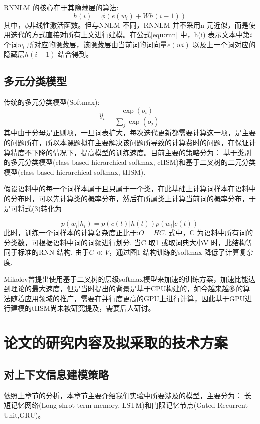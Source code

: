 \documentclass[12pt,a4paper]{article}
\begin{document}
RNNLM 的核心在于其隐藏层的算法:
\begin{equation}
\label{equ:rnn}
h(i) =\phi(e(w_i) +Wh(i -1))
\end{equation}
其中，$\phi$非线性激活函数。但与NNLM 不同，RNNLM 并不采用n 元近似，而是使用迭代的方式直接对所有上文进行建模。在公式\ref{equ:rnn} 中，h(i) 表示文本中第$i$ 个词$w_i$ 所对应的隐藏层，该隐藏层由当前词的词向量$e(wi)$ 以及上一个词对应的隐藏层$h(i -1)$ 结合得到。

\subsection{多元分类模型}
传统的多元分类模型(Softmax):
\begin{equation}\label{equ:softmax}
  \hat y_i=\frac{\exp(o_i)}{\sum_j \exp(o_j)}
\end{equation}
其中由于分母是正则项，一旦词表扩大，每次迭代更新都需要计算这一项，是主要的问题所在，所以本课题拟在主要解决该问题所导致的计算费时的问题，在保证计算精度不下降的情况下，提高模型的训练速度。目前主要的策略分为： 基于类别的多元分类模型(class-based hierarchical softmax, cHSM)和基于二叉树的二元分类模型(class-based hierarchical softmax, tHSM).

假设语料中的每一个词样本属于且只属于一个类，在此基础上计算词样本在语料中的分布时，可以先计算类的概率分布，然后在所属类上计算当前词的概率分布，于是可将式(3)转化为

\begin{equation}\label{equ:class}
  p(w_i|h_i) = p(c(t)|h(t))p(w_i|c(t))
\end{equation}
此时，训练一个词样本的计算复杂度正比于:$O =HC$. 式中，C 为语料中所有词的分类数，可根据语料中词的词频进行划分. 当C 取1 或取词典大小V 时，此结构等同于标准的RNN 结构. 由于$C \ll V$，通过图1 结构训练的softmax 降低了计算复杂度.

Mikolov曾提出使用基于二叉树的层级softmax模型来加速的训练方案，加速比能达到理论的最大速度，但是当时提出的背景是基于CPU构建的，如今越来越多的算法随着应用领域的推广，需要在并行度更高的GPU上进行计算，因此基于GPU进行建模的tHSM尚未被研究提及，需要后人研讨。


\section{论文的研究内容及拟采取的技术方案}
\subsection{对上下文信息建模策略}
依照上章节的分析，本章节主要介绍我们实验中所要涉及的模型，主要分为： 长短记忆网络(Long shrot-term memory, LSTM)和门限记忆节点(Gated Recurrent Unit,GRU)。
\end{document}
